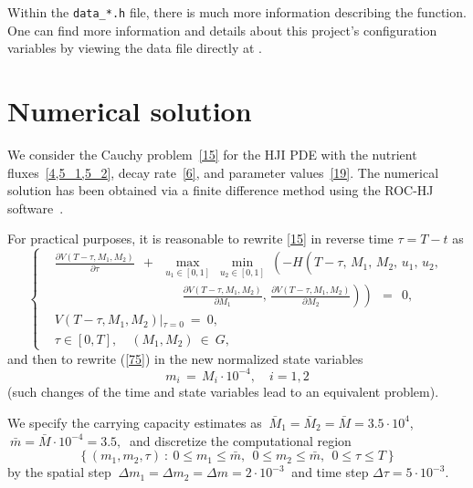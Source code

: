 \documentclass[11pt]{amsart}
\begin{document}
Within the \texttt{data\_*.h} file, there is much more information describing the function. 
One can find more information and details about this project's configuration variables by viewing the data file directly at \cite{data_ivan.h}.


\section{Numerical solution}

We consider the Cauchy problem~\cref{15} for the HJI PDE with the nutrient fluxes~\cref{4,5_1,5_2}, decay rate~\cref{6}, and
parameter values~\cref{19}. The numerical solution has been obtained via a finite difference method
\cite{FlemingSoner2006,OsherShu1991,BotkinHoffmannTurova2011,BokanForcadelZidani2010} using the ROC-HJ software~\cite{ROCHJ2019}.

For practical purposes, it is reasonable to rewrite \cref{15} in reverse time $ \tau = T - t $ as
\begin{equation}
\left\{ \begin{aligned}
& \frac{\partial V(T - \tau, M_1, M_2)}{\partial \tau} \:\: + \:\: \max_{u_1 \in [0, 1]} \: \min_{u_2 \in [0, 1]} \:
\left( -H \left( T - \tau, \, M_1, \, M_2, \, u_1, \, u_2,  {}^{{}^{{}^{{}^{{}^{}}}}} \right. \right. \\
& \qquad\qquad\qquad\qquad\qquad
\left. \left. \frac{\partial V(T - \tau, M_1, M_2)}{\partial M_1}, \,
\frac{\partial V(T - \tau, M_1, M_2)}{\partial M_2} \right) \right) \:\: = \:\: 0, \\
& V(T - \tau, M_1, M_2) \left|_{\tau = 0} \right. \: = \: 0, \\
& \tau \in [0, T], \quad (M_1, M_2) \: \in \: G,
\end{aligned} \right.  \label{75}
\end{equation}
and then to rewrite (\ref{75}) in the new normalized state variables
\begin{equation}
m_i \, = \, M_i \cdot 10^{-4}, \quad i = 1,2  \label{75_1}
\end{equation}
(such changes of the time and state variables lead to an equivalent problem).

We specify the carrying capacity estimates as $ \: \bar{M}_1 = \bar{M}_2 = \bar{M} = 3.5 \cdot 10^4 $,
$ \: \bar{m} = \bar{M} \cdot 10^{-4} = 3.5, \: $ and discretize the computational region
$$
\left\{ (m_1, m_2, \tau) \: \colon \: 0 \leqslant m_1 \leqslant \bar{m}, \:\: 0 \leqslant m_2 \leqslant \bar{m}, \:\:
0 \leqslant \tau \leqslant T \right\}
$$
by the spatial step $ \: \Delta m_1 = \Delta m_2 = \Delta m = 2 \cdot 10^{-3} \: $ and time step $ \Delta \tau = 5 \cdot 10^{-3} $.
\end{document}
